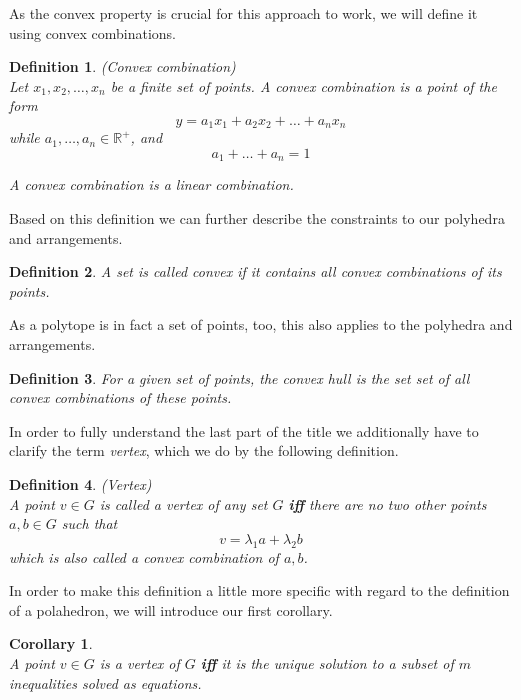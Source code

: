 \documentclass[a4paper, 11pt]{article}
\newtheorem{mydef}{Definition}
\newtheorem{corollary}{Corollary}
\begin{document}
As the convex property is crucial for this approach to work, we will define it using convex combinations.
\begin{mydef}(Convex combination)\\
	
	Let $x_1, x_2, \dots, x_n$ be a finite set of points. A convex combination is a point of the form 
	\begin{equation*}
		y = a_1x_1 + a_2x_2 + \dots + a_nx_n
	\end{equation*}
	while $a_1, \dots, a_n\in\mathbb{R^+}$, and
	\begin{equation*}
		a_1 + \dots + a_n = 1
	\end{equation*}
	
	A convex combination is a linear combination.
\end{mydef}
Based on this definition we can further describe the constraints to our polyhedra and arrangements.
\begin{mydef}
	A set is called \textit{convex} if it contains all convex combinations of its points.
\end{mydef}
As a polytope is in fact a set of points, too, this also applies to the polyhedra and arrangements.
\begin{mydef}
	For a given set of points, the convex hull is the set set of all convex combinations of these points.
\end{mydef}

In order to fully understand the last part of the title we additionally have to clarify the term \textit{vertex}, which we do by the following definition.

\begin{mydef}(Vertex)\\
	A point $v\in G$ is called a \textit{vertex} of any set $G$ \textbf{iff} there are no two other points $a,b\in G$ such that
	\begin{equation}
		v=\lambda_1 a + \lambda_2 b
	\end{equation}
	which is also called a \textit{convex combination} of $a,b$.
\end{mydef}

In order to make this definition a little more specific with regard to the definition of a polahedron, we will introduce our first corollary.

\begin{corollary}\label{corollary1}\cite{introtoAlg}\\
	A point $v\in G$ is a \textit{vertex} of $G$ \textbf{iff} it is the unique solution to a subset of $m$ inequalities solved as equations. 
\end{corollary}
\end{document}
